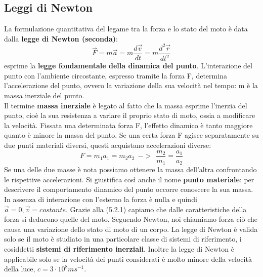 \documentclass{article}
\numberwithin{equation}{subsection}
\begin{document}
  \subsection{Leggi di Newton}
La formulazione quantitativa del legame tra la forza e lo stato del moto è data dalla \textbf{legge di Newton (seconda)}:
\begin{equation}
    \vec{F} = m\vec{a} = m \frac{d\vec{v}}{dt}=m \frac{d^2\vec{r}}{dt^2}
\end{equation}
esprime la \textbf{legge fondamentale della dinamica del punto}.
L'interazione del punto con l'ambiente circostante, espresso tramite la forza F, determina l'accelerazione del punto, ovvero la variazione della sua velocità nel tempo: m è la massa inerziale del punto. \\
Il termine \textbf{massa inerziale} è legato al fatto che la massa esprime l'inerzia del punto, cioè la sua resistenza a variare il proprio stato di moto, ossia a modificare la velocità. Fissata una determinata forza F, l'effetto dinamico è tanto maggiore quanto è minore la massa del punto. Se una certa forza F agisce separatamente su due punti materiali diversi, questi acquistano accelerazioni diverse:
\begin{equation}
    F=m_1a_1=m_2a_2 \ \ -> \  \ \frac{m_2}{m_1}=\frac{a_1}{a_2}
\end{equation}
Se una delle due masse è nota possiamo ottenere la massa dell'altra confrontando le rispettive accelerazioni. Si giustifica così anche il nome \textbf{punto materiale}: per descrivere il comportamento dinamico del punto occorre conoscere la sua massa. In assenza di interazione con l'esterno la forza è nulla e quindi $\vec{a}=0,\vec{v}=costante$. Grazie alla (5.2.1) capiamo che dalle caratteristiche della forza si deducono quelle del moto. Seguendo Newton, noi chiamiamo forza ciò che causa una variazione dello stato di moto di un corpo. La legge di Newton è valida solo se il moto è studiato in una particolare classe di sistemi di riferimento, i cosiddetti \textbf{sistemi di riferimento inerziali}. Inoltre la legge di Newton è applicabile solo se la velocità dei punti considerati è molto minore della velocità della luce, $c=3 \cdot10^8 ms^{-1}$.
\end{document}
